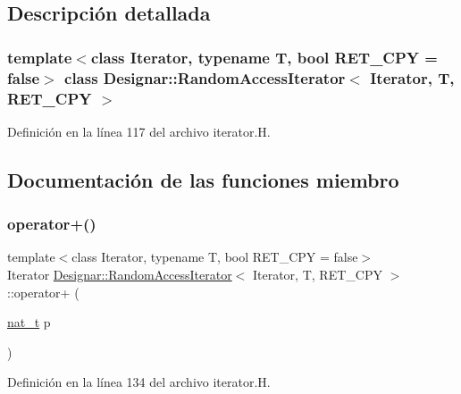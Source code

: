 \subsection{Descripción detallada}
\subsubsection*{template$<$class Iterator, typename T, bool R\+E\+T\+\_\+\+C\+PY = false$>$\newline
class Designar\+::\+Random\+Access\+Iterator$<$ Iterator, T, R\+E\+T\+\_\+\+C\+P\+Y $>$}



Definición en la línea 117 del archivo iterator.\+H.



\subsection{Documentación de las funciones miembro}
\mbox{\label{class_designar_1_1_random_access_iterator_af5b2b9cab5cf3ac48cbc712c24f02c97}} 
\subsubsection{\texorpdfstring{operator+()}{operator+()}}
{\footnotesize\ttfamily template$<$class Iterator, typename T, bool R\+E\+T\+\_\+\+C\+PY = false$>$ \\
Iterator \hyperlink{class_designar_1_1_random_access_iterator}{Designar\+::\+Random\+Access\+Iterator}$<$ Iterator, T, R\+E\+T\+\_\+\+C\+PY $>$\+::operator+ (\begin{DoxyParamCaption}\item[{\hyperlink{namespace_designar_aa72662848b9f4815e7bf31a7cf3e33d1}{nat\+\_\+t}}]{p }\end{DoxyParamCaption})\hspace{0.3cm}{\ttfamily [inline]}}



Definición en la línea 134 del archivo iterator.\+H.

\mbox{\label{class_designar_1_1_random_access_iterator_aad12a146046f6463476453b3aac61359}} 
